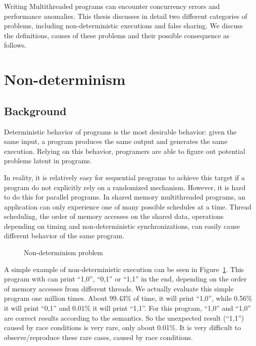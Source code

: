 \label{chapter:problems}

Writing Multithreaded programs can encounter concurrency errors and performance anomalies. This thesis discusses in detail two different categories of problems, including non-deterministic executions and false sharing.  We discuss the definitions, causes of these problems and their possible consequence as follows.


\section{Non-determinism}
\label{sec:nondeterminism}

\subsection{Background}
Deterministic behavior of programs is the most desirable behavior: given the same input, a program
produces the same output and generates the same execution. Relying on this behavior, programers
are able to figure out potential problems latent in programs. 

In reality, it is relatively easy for sequential programs to achieve this target if a program do not explicitly rely on a randomized mechanism. 
However, it is hard to do this for parallel programs. In shared memory multithreaded programs, an application can only experience one of many possible 
schedules at a time. Thread scheduling, the order of memory accesses on the shared data, operations depending on timing and non-deterministic synchronizations, can easily cause different behavior of the same program.


\begin{figure}[!ht]
{\centering
\fbox{
\subfigure{}
\hspace{20pt}
\subfigure{}
\hspace{20pt}
\subfigure{}
}
\caption{Non-determinism problem 
\label{fig:nondeterminism}}
}
\end{figure}

A simple example of non-deterministic execution can be seen in Figure~\ref{fig:nondeterminism}. This program with \pthreads{} can print ``1,0'', ``0,1'' or ``1,1'' in the end, depending on the order of memory accesses from different threads. We actually evaluate this simple program one million times. About 99.43\% of time, it will print ``1,0'', while 0.56\% it will print ``0,1'' and 0.01\% it will print ``1,1''. For this program, ``1,0'' and ``1,0'' are correct results according to the semantics. So the unexpected result (``1,1'') caused by race conditions is very rare, only about 0.01\%.  
It is very difficult to observe/reproduce these rare cases, caused by race conditions.

